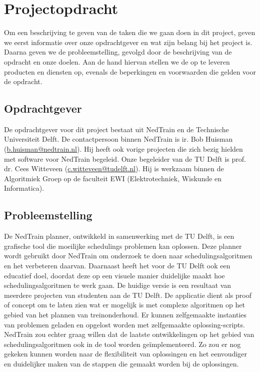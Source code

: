 \section{Projectopdracht}
Om een beschrijving te geven van de taken die we gaan doen in dit project, geven we eerst informatie over onze opdrachtgever en wat zijn belang bij het project is. Daarna geven we de probleemstelling, gevolgd door de beschrijving van de opdracht en onze doelen. Aan de hand hiervan stellen we de op te leveren producten en diensten op, evenals de beperkingen en voorwaarden die gelden voor de opdracht.

\subsection{Opdrachtgever}
De opdrachtgever voor dit project bestaat uit NedTrain en de Technische Universiteit Delft. De contactpersoon binnen NedTrain is ir. Bob Huisman (\href{mailto:b.huisman@nedtrain.nl}{b.huisman@nedtrain.nl}). Hij heeft ook vorige projecten die zich bezig hielden met software voor NedTrain begeleid. Onze begeleider van de TU Delft is prof. dr. Cees Witteveen (\href{mailto:c.witteveen@tudelft.nl}{c.witteveen@tudelft.nl}). Hij is werkzaam binnen de Algoritmiek Groep op de faculteit EWI (Elektrotechniek, Wiskunde en Informatica).

\subsection{Probleemstelling}
De NedTrain planner, ontwikkeld in samenwerking met de TU Delft, is een grafische tool die moeilijke schedulings problemen kan oplossen. Deze planner wordt gebruikt door NedTrain om onderzoek te doen naar schedulingsalgoritmen en het verbeteren daarvan. Daarnaast heeft het voor de TU Delft ook een educatief doel, doordat deze op een visuele manier duidelijke maakt hoe schedulingsalgoritmen te werk gaan. De huidige versie is een resultaat van meerdere projecten van studenten aan de TU Delft. De applicatie dient als proof of concept om te laten zien wat er mogelijk is met complexe algoritmen op het gebied van het plannen van treinonderhoud. Er kunnen zelfgemaakte instanties van problemen geladen en opgelost worden met zelfgemaakte oplossing-scripts. NedTrain zou echter graag willen dat de laatste ontwikkelingen op het gebied van schedulingsalgoritmen ook in de tool worden ge\"implementeerd. Zo zou er nog gekeken kunnen worden naar de flexibiliteit van oplossingen en het eenvoudiger en duidelijker maken van de stappen die gemaakt worden bij de oplossingen. 

